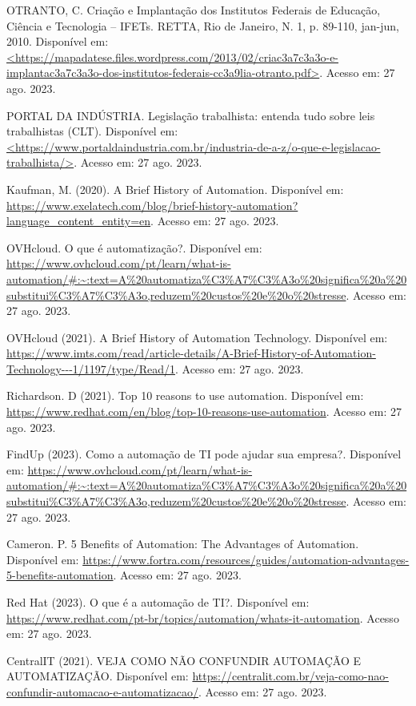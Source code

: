 \documentclass[12pt]{article}
\begin{document}
\begin{thebibliography}{11}
OTRANTO, C. Criação e Implantação dos Institutos Federais de Educação, Ciência e Tecnologia – IFETs. RETTA, Rio de Janeiro, N. 1, p. 89-110, jan-jun, 2010. Disponível em: \url{<https://mapadatese.files.wordpress.com/2013/02/criac3a7c3a3o-e-implantac3a7c3a3o-dos-institutos-federais-cc3a9lia-otranto.pdf>}. Acesso em: 27 ago. 2023.

PORTAL DA INDÚSTRIA. Legislação trabalhista: entenda tudo sobre leis trabalhistas (CLT). Disponível em: \url{<https://www.portaldaindustria.com.br/industria-de-a-z/o-que-e-legislacao-trabalhista/>}. Acesso em: 27 ago. 2023.

Kaufman, M. (2020). A Brief History of Automation. Disponível em: \url{https://www.exelatech.com/blog/brief-history-automation?language_content_entity=en}. Acesso em: 27 ago. 2023.

OVHcloud. O que é automatização?. Disponível em: \url{https://www.ovhcloud.com/pt/learn/what-is-automation/#:~:text=A%20automatiza%C3%A7%C3%A3o%20significa%20a%20substitui%C3%A7%C3%A3o,reduzem%20custos%20e%20o%20stresse}. Acesso em: 27 ago. 2023.

OVHcloud (2021). A Brief History of Automation Technology. Disponível em: \url{https://www.imts.com/read/article-details/A-Brief-History-of-Automation-Technology---1/1197/type/Read/1}. Acesso em: 27 ago. 2023.

Richardson. D (2021). Top 10 reasons to use automation. Disponível em: \url{https://www.redhat.com/en/blog/top-10-reasons-use-automation}. Acesso em: 27 ago. 2023.

FindUp (2023). Como a automação de TI pode ajudar sua empresa?. Disponível em: \url{https://www.ovhcloud.com/pt/learn/what-is-automation/#:~:text=A%20automatiza%C3%A7%C3%A3o%20significa%20a%20substitui%C3%A7%C3%A3o,reduzem%20custos%20e%20o%20stresse}. Acesso em: 27 ago. 2023.

Cameron. P. 5 Benefits of Automation: The Advantages of Automation. Disponível em: \url{https://www.fortra.com/resources/guides/automation-advantages-5-benefits-automation}. Acesso em: 27 ago. 2023.

Red Hat (2023). O que é a automação de TI?. Disponível em: \url{https://www.redhat.com/pt-br/topics/automation/whats-it-automation}. Acesso em: 27 ago. 2023.

CentralIT (2021). VEJA COMO NÃO CONFUNDIR AUTOMAÇÃO E AUTOMATIZAÇÃO. Disponível em: \url{https://centralit.com.br/veja-como-nao-confundir-automacao-e-automatizacao/}. Acesso em: 27 ago. 2023.



\end{thebibliography}
\endgroup
\end{document}
